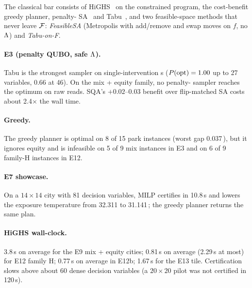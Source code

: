 The classical bar consists of HiGHS~\cite{huangfu2018} on the constrained program, the
cost-benefit greedy planner, penalty-\QUBO{} SA~\cite{kirkpatrick1983} and
Tabu~\cite{glover1989}, and two feasible-space methods that never leave $\mathcal{F}$:
\emph{FeasibleSA} (Metropolis with add/remove and swap moves on $f$, no $\Lambda$) and
\emph{Tabu-on-F}.

\paragraph{E3 (penalty QUBO, safe $\Lambda$).} Tabu is the strongest sampler on single-intervention
\QUBO{}s ($P(\mathrm{opt})=1.00$ up to 27 variables, 0.66 at 46). On the mix + equity family, no
penalty-\QUBO{} sampler reaches the optimum on raw reads. SQA's $+0.02$--$0.03$ benefit over
flip-matched SA costs about 2.4$\times$ the wall time.

\paragraph{Greedy.} The greedy planner is optimal on 8 of 15 park instances (worst gap
0.037\,\degC{}), but it ignores equity and is infeasible on 5 of 9 mix instances in E3 and on 6 of 9
family-H instances in E12.

\paragraph{E7 showcase.} On a $14\times14$ city with 81 decision variables, MILP certifies in
10.8\,s and lowers the exposure temperature from 32.311 to 31.141\,\degC{}; the greedy planner
returns the same plan.

\paragraph{HiGHS wall-clock.} 3.8\,s on average for the E9 mix + equity cities; 0.81\,s on
average (2.29\,s at most) for E12 family H; 0.77\,s on average in E12b; 1.67\,s for the E13 tile.
Certification slows above about 60 dense decision variables (a $20\times20$ pilot was not certified
in 120\,s).
